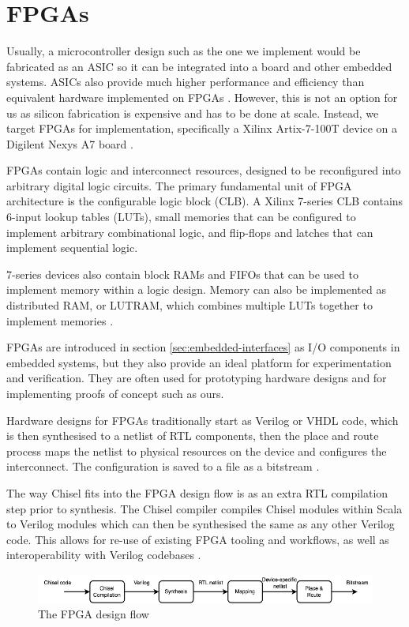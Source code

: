 \section{FPGAs}

Usually, a microcontroller design such as the one we implement would be fabricated as an ASIC so it can be integrated into a board and other embedded systems. ASICs also provide much higher performance and efficiency than equivalent hardware implemented on FPGAs \cite{fpga_v_asic}. However, this is not an option for us as silicon fabrication is expensive and has to be done at scale. Instead, we target FPGAs for implementation, specifically a Xilinx Artix-7-100T device on a Digilent Nexys A7 board \cite{digilent}.

FPGAs contain logic and interconnect resources, designed to be reconfigured into arbitrary digital logic circuits. The primary fundamental unit of FPGA architecture is the configurable logic block (CLB). A Xilinx 7-series CLB contains 6-input lookup tables (LUTs), small memories that can be configured to implement arbitrary combinational logic, and flip-flops and latches that can implement sequential logic.

7-series devices also contain block RAMs and FIFOs that can be used to implement memory within a logic design. Memory can also be implemented as distributed RAM, or LUTRAM, which combines multiple LUTs together to implement memories \cite{fpga_arch}.

FPGAs are introduced in section \ref{sec:embedded-interfaces} as I/O components in embedded systems, but they also provide an ideal platform for experimentation and verification. They are often used for prototyping hardware designs and for implementing proofs of concept such as ours.

Hardware designs for FPGAs traditionally start as Verilog or VHDL code, which is then synthesised to a netlist of RTL components, then the place and route process maps the netlist to physical resources on the device and configures the interconnect. The configuration is saved to a file as a bitstream \cite{vivado_design}.

The way Chisel fits into the FPGA design flow is as an extra RTL compilation step prior to synthesis. The Chisel compiler compiles Chisel modules within Scala to Verilog modules which can then be synthesised the same as any other Verilog code. This allows for re-use of existing FPGA tooling and workflows, as well as interoperability with Verilog codebases \cite{chisel}.

\begin{figure}[H!]
    \centering
    \includegraphics[width=\textwidth]{../img/design-flow.png}
    \caption{The FPGA design flow}
    \label{fig:design-flow}
\end{figure}